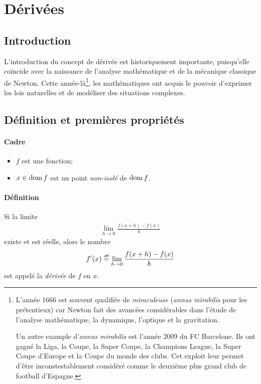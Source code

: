 \documentclass[main.tex]{subfiles}
\begin{document}
\chapter{Dérivées}

\section{Introduction}

L'introduction du concept de dérivée est historiquement importante,
puisqu'elle coïncide avec la naissance de l'analyse mathématique et de la mécanique classique de Newton.
Cette année-là\footnote{%
    L'année 1666 est souvent qualifiée de \emph{miraculeuse} (\emph{annus mirabilis} pour les prétentieux)
    car Newton fait des avancées considérables dans l'étude de 
    l'analyse mathématique, la dynamique, l'optique et la gravitation.

    Un autre example d'\emph{annus mirabilis} est l'année 2009 du FC Barcelone.
    Ils ont gagné la Liga, la Coupe, la Super Coupe, la Champions League, la Super Coupe d'Europe et la Coupe du monde des clubs.
    Cet exploit leur permet d'être inconstestablement considéré comme le deuxième plus grand club de football d'Espagne.
},
les mathématiques ont acquis le pouvoir d'exprimer les lois naturelles et de modéliser des situations complexes.

\section{Définition et premières propriétés}

\begin{definition}
    [Dérivée]

    \subsubsection*{Cadre}

    \begin{itemize}
        \item $f$ est une fonction;
        \item $x \in \operatorname{dom} f$ est un point \emph{non-isolé} de $\operatorname{dom} f$.
    \end{itemize}

    \subsubsection*{Définition}

    Si la limite
    \begin{align}
        \lim_{h \to 0} \frac {f(x + h) - f(x)} h
    \end{align}
    existe et est réelle,
    alors le nombre
    \begin{align}
        f'(x) \defeq \lim_{h \to 0} \frac {f(x + h) - f(x)} h
    \end{align}
    est appelé la \emph{dérivée} de $f$ en $x$.
\end{definition}
\end{document}
